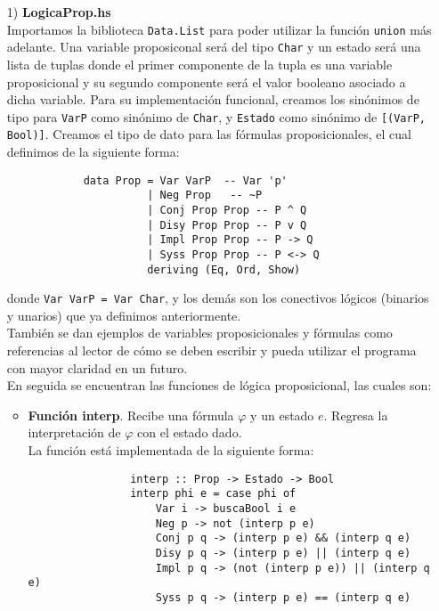 \documentclass[letterpaper,12pt]{article}
\begin{document}
    \begin{itemize}
        \item[1)] \textbf{LogicaProp.hs} \\
        Importamos la biblioteca \texttt{Data.List} para poder utilizar 
        la función \texttt{union} más adelante. Una variable proposiconal 
        será del tipo \texttt{Char} y un estado será una lista de tuplas donde 
        el primer componente de la tupla es una variable proposicional y su 
        segundo componente será el valor booleano asociado a dicha variable.
        Para su implementación funcional, creamos los sinónimos de tipo para 
        \texttt{VarP} como sinónimo de \texttt{Char}, y \texttt{Estado} como 
        sinónimo de \texttt{[(VarP, Bool)]}. Creamos el tipo de dato para las 
        fórmulas proposicionales, el cual definimos de la siguiente forma:
        \begin{lstlisting}
            data Prop = Var VarP  -- Var 'p'
                      | Neg Prop   -- ~P
                      | Conj Prop Prop -- P ^ Q
                      | Disy Prop Prop -- P v Q
                      | Impl Prop Prop -- P -> Q
                      | Syss Prop Prop -- P <-> Q
                      deriving (Eq, Ord, Show)
        \end{lstlisting}

        donde \texttt{Var VarP = Var Char}, y los demás son los conectivos 
        lógicos (binarios y unarios) que ya definimos anteriormente. \\
        También se dan ejemplos de variables proposicionales y fórmulas 
        como referencias al lector de cómo se deben escribir y pueda utilizar 
        el programa con mayor claridad en un futuro. \\ 
        En seguida se encuentran las funciones de lógica proposicional, las
        cuales son:

        \begin{itemize}
            \item \textbf{Función interp}. Recibe una fórmula $\varphi$ y un 
            estado $e$. Regresa la interpretación de $\varphi$ con el estado 
            dado.\\
            La función está implementada de la siguiente forma:
            \begin{lstlisting}
                interp :: Prop -> Estado -> Bool
                interp phi e = case phi of 
                    Var i -> buscaBool i e
                    Neg p -> not (interp p e)
                    Conj p q -> (interp p e) && (interp q e)
                    Disy p q -> (interp p e) || (interp q e)
                    Impl p q -> (not (interp p e)) || (interp q e)
                    Syss p q -> (interp p e) == (interp q e)
            \end{lstlisting}


\end{itemize}
\end{itemize}
\end{document}
